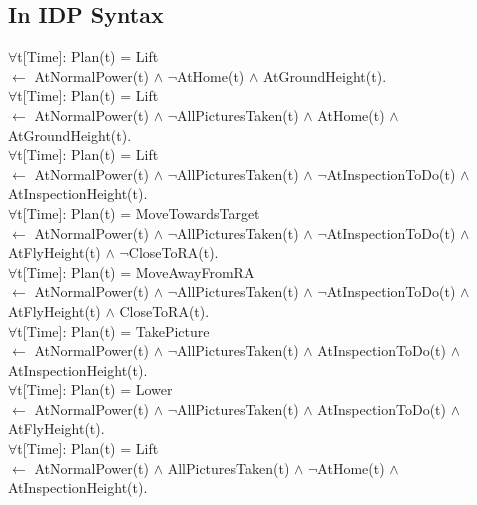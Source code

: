 \documentclass{article}
\begin{document}
\begin{landscape}
\subsection{In IDP Syntax}
\label{PlanningInIDPsyntax}
$\forall$t[Time]: Plan(t) = Lift 				\\ \indent$\leftarrow$ AtNormalPower(t) $\wedge$ $\neg$AtHome(t) $\wedge$ AtGroundHeight(t).\vspace{2mm}\\
$\forall$t[Time]: Plan(t) = Lift 				\\ \indent$\leftarrow$ AtNormalPower(t) $\wedge$ $\neg$AllPicturesTaken(t) $\wedge$  AtHome(t) $\wedge$ AtGroundHeight(t).\vspace{2mm}\\
$\forall$t[Time]: Plan(t) = Lift 				\\ \indent$\leftarrow$ AtNormalPower(t) $\wedge$ $\neg$AllPicturesTaken(t) $\wedge$ $\neg$AtInspectionToDo(t) $\wedge$ AtInspectionHeight(t).\vspace{2mm}\\
$\forall$t[Time]: Plan(t) = MoveTowardsTarget 	\\ \indent$\leftarrow$ AtNormalPower(t) $\wedge$ $\neg$AllPicturesTaken(t) $\wedge$ $\neg$AtInspectionToDo(t) $\wedge$ AtFlyHeight(t) $\wedge$ $\neg$CloseToRA(t).\vspace{2mm}\\
$\forall$t[Time]: Plan(t) = MoveAwayFromRA	 	\\ \indent$\leftarrow$ AtNormalPower(t) $\wedge$ $\neg$AllPicturesTaken(t) $\wedge$ $\neg$AtInspectionToDo(t) $\wedge$ AtFlyHeight(t) $\wedge$ CloseToRA(t).\vspace{2mm}\\
$\forall$t[Time]: Plan(t) = TakePicture 		\\ \indent$\leftarrow$ AtNormalPower(t) $\wedge$ $\neg$AllPicturesTaken(t) $\wedge$  AtInspectionToDo(t) $\wedge$ AtInspectionHeight(t).\vspace{2mm}\\
$\forall$t[Time]: Plan(t) = Lower 				\\ \indent$\leftarrow$ AtNormalPower(t) $\wedge$ $\neg$AllPicturesTaken(t) $\wedge$  AtInspectionToDo(t) $\wedge$ AtFlyHeight(t).\vspace{2mm}\\
$\forall$t[Time]: Plan(t) = Lift 				\\ \indent$\leftarrow$ AtNormalPower(t) $\wedge$  AllPicturesTaken(t) $\wedge$ $\neg$AtHome(t) $\wedge$ AtInspectionHeight(t).\vspace{2mm}\\

\end{landscape}
\end{document}
